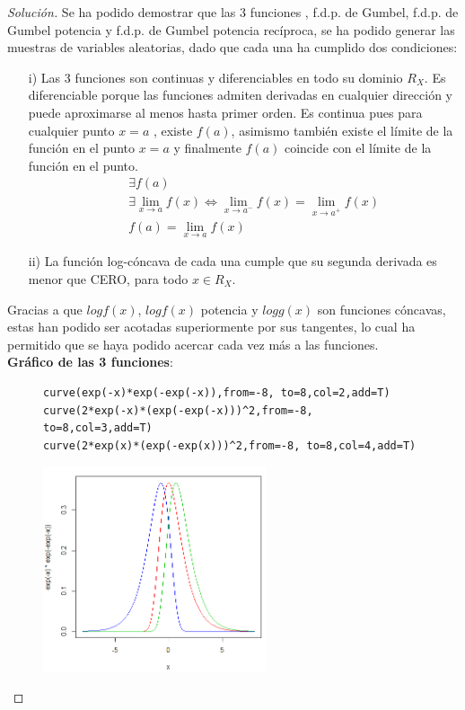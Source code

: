 \documentclass[11pt]{article}
\renewcommand{\=}[1]{\stackrel{#1}{=}} %
\newenvironment{sol}
{\begin{proof}[Solución]}
	{\end{proof}}
\theoremstyle{definition}
\theoremstyle{remark}
\begin{document}
\begin{itemize}
\begin{sol}
Se ha podido demostrar que las 3 funciones , f.d.p. de Gumbel, f.d.p. de Gumbel potencia y f.d.p. de Gumbel potencia recíproca, se ha podido generar las muestras de variables aleatorias, dado que cada una ha cumplido dos condiciones:
\begin{itemize}
	\item[i)] Las 3 funciones son continuas y diferenciables en todo su dominio $R_X$. Es diferenciable porque las funciones admiten derivadas en cualquier dirección y puede aproximarse al menos hasta primer orden. Es continua pues para cualquier punto $x=a$ , existe $f(a)$, asimismo también existe el límite de la función en el punto $x=a$ y finalmente $f(a)$ coincide con el límite de la función en el punto.
	\begin{eqnarray}
	&&\exists f(a)\\
	&&\exists\lim\limits_{x\rightarrow a}f(x)\Leftrightarrow \lim\limits_{x\rightarrow a^-}f(x)=\lim\limits_{x\rightarrow a^+}f(x)\\
	&&f(a)=\lim\limits_{x\rightarrow a}f(x)
	\end{eqnarray}
	\item[ii)] La función log-cóncava de cada una cumple que su segunda derivada es menor que CERO, para todo $x\in R_X$.
\end{itemize}
Gracias a que $log f(x)$, $log f(x)$ potencia y $log g(x)$ son funciones cóncavas, estas han podido ser acotadas superiormente por sus tangentes, lo cual ha permitido que se haya podido acercar cada vez más a las  funciones.\\
\newpage
{\bf Gráfico de las 3 funciones}:
\begin{figure}[h]
	\hspace*{0.9cm}\begin{minipage}{9cm}
		{
			\begin{lstlisting}[style=myRstyle, caption={Gráfico de las 3 funciones / GUMBEL.}]
curve(exp(-x)*exp(-exp(-x)),from=-8, to=8,col=2,add=T)
curve(2*exp(-x)*(exp(-exp(-x)))^2,from=-8, to=8,col=3,add=T)
curve(2*exp(x)*(exp(-exp(x)))^2,from=-8, to=8,col=4,add=T)
			\end{lstlisting}
		}			
	\end{minipage}
	\begin{minipage}{6cm}
		\includegraphics[width=6.6cm]{3di}
	\end{minipage}
\end{figure}
\end{sol}
\end{itemize}
\end{document}

